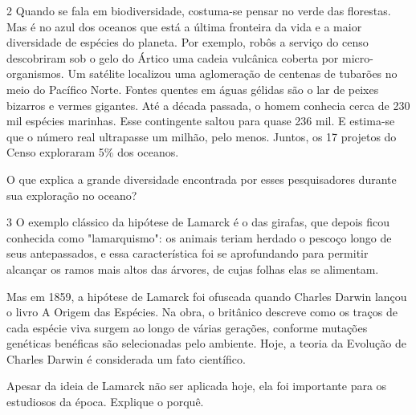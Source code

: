 \num{2} Quando se fala em biodiversidade, costuma-se pensar no verde das florestas. Mas é no azul dos oceanos que está a última fronteira da vida e a maior diversidade de espécies do planeta. Por exemplo, robôs a serviço do censo descobriram sob o gelo do Ártico uma cadeia vulcânica coberta por micro-organismos. Um satélite localizou uma aglomeração de centenas de tubarões no meio do Pacífico Norte. Fontes quentes em águas gélidas são o lar de peixes bizarros e vermes gigantes. Até a década passada, o homem conhecia cerca de 230 mil espécies marinhas. Esse contingente saltou para quase 236 mil. E estima-se que o número real ultrapasse um milhão, pelo menos. Juntos, os 17 projetos do Censo exploraram 5\% dos oceanos.


O que explica a grande diversidade encontrada por esses pesquisadores
durante sua exploração no oceano?



\num{3}  O exemplo clássico da hipótese de Lamarck é o das girafas, que depois ficou conhecida como "lamarquismo": os animais teriam herdado o pescoço longo de seus antepassados, e essa característica foi se aprofundando para permitir alcançar os ramos mais altos das árvores, de cujas folhas elas se alimentam.

Mas em 1859, a hipótese de Lamarck foi ofuscada quando Charles Darwin
lançou o livro A Origem das Espécies. Na obra, o britânico descreve como
os traços de cada espécie viva surgem ao longo de várias gerações,
conforme mutações genéticas benéficas são selecionadas pelo ambiente.
Hoje, a teoria da Evolução de Charles Darwin é considerada um fato
científico.


Apesar da ideia de Lamarck não ser aplicada hoje, ela foi importante
para os estudiosos da época. Explique o porquê.

